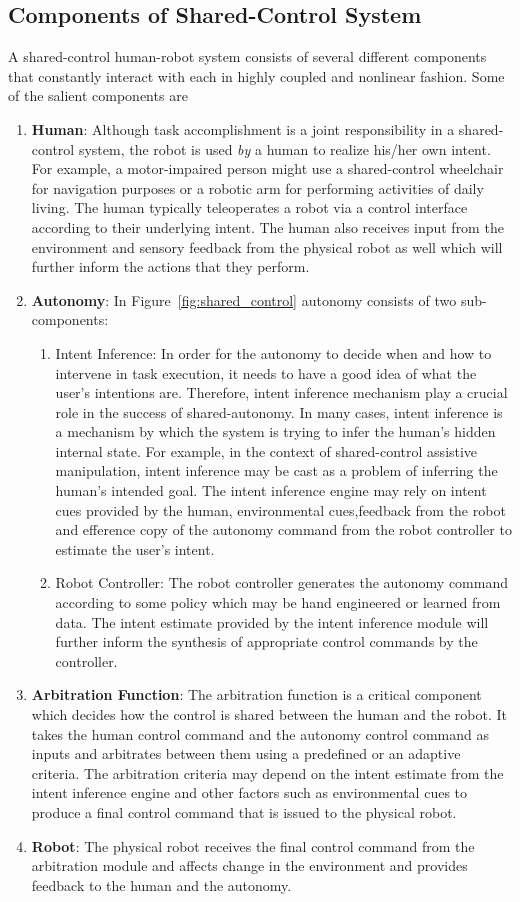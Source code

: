 \documentclass[letterpaper, 10 pt, conference]{ieeeconf}  %
\begin{document}
\subsection{Components of Shared-Control System}
A shared-control human-robot system consists of several different components that constantly interact with each in highly coupled and nonlinear fashion. Some of the salient components are 
\begin{enumerate}
	\item \textbf{Human}: Although task accomplishment is a joint responsibility  in a shared-control system, the robot is used \textit{by} a human to realize his/her own intent. For example, a motor-impaired person might use a shared-control wheelchair for navigation purposes or a robotic arm for performing activities of daily living. The human typically teleoperates a robot via a control interface according to their underlying intent. The human also receives input from the environment and sensory feedback from the physical robot as well which will further inform the actions that they perform.
	\item \textbf{Autonomy}: In Figure~\ref{fig:shared_control} autonomy consists of two sub-components:
		\begin{enumerate}
			\item Intent Inference: In order for the autonomy to decide when and how to intervene in task execution, it needs to have a good idea of what the user's intentions are. Therefore, intent inference mechanism play a crucial role in the success of shared-autonomy. In many cases, intent inference is a mechanism by which the system is trying to infer the human's hidden internal state. For example, in the context of shared-control assistive manipulation, intent inference may be cast as a problem of inferring the human's intended goal. The intent inference engine may rely on intent cues provided by the human, environmental cues,feedback from the robot and efference copy of the autonomy command from the robot controller to estimate the user's intent. 
			\item Robot Controller: The robot controller generates the autonomy command according to some policy which may be hand engineered or learned from data. The intent estimate provided by the intent inference module will further inform the synthesis of appropriate control commands by the controller. 
		\end{enumerate}
	\item \textbf{Arbitration Function}: The arbitration function is a critical component which decides how the control is shared between the human and the robot. It takes the human control command and the autonomy control command as inputs and arbitrates between them using a predefined or an adaptive criteria. The arbitration criteria may depend on the intent estimate from the intent inference engine and other factors such as environmental cues to produce a final control command that is issued to the physical robot. 
	\item \textbf{Robot}: The physical robot receives the final control command from the arbitration module and affects change in the environment and provides feedback to the human and the autonomy. 
\end{enumerate}
\end{document}
